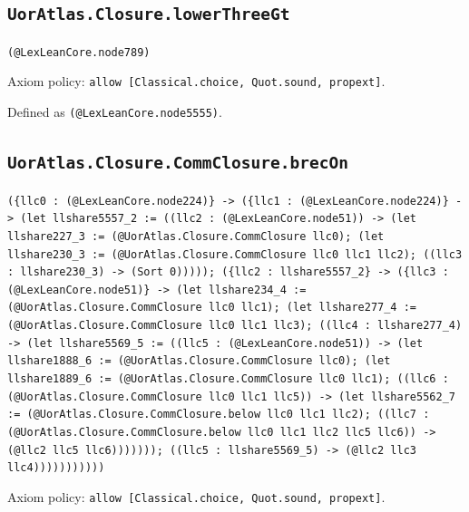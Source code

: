 \documentclass[11pt]{article}
\begin{document}
\subsection*{\texttt{UorAtlas.Closure.lowerThreeGt}}
\noindent\texttt{(@LexLeanCore.node789)}\par
\noindent Axiom policy: \texttt{allow [Classical.choice, Quot.sound, propext]}.\par
\noindent Defined as \texttt{(@LexLeanCore.node5555)}.\par
\subsection*{\texttt{UorAtlas.Closure.CommClosure.brecOn}}
\noindent\texttt{(\{llc0 : (@LexLeanCore.node224)\} -> (\{llc1 : (@LexLeanCore.node224)\} -> (let llshare5557\_2 := ((llc2 : (@LexLeanCore.node51)) -> (let llshare227\_3 := (@UorAtlas.Closure.CommClosure llc0); (let llshare230\_3 := (@UorAtlas.Closure.CommClosure llc0 llc1 llc2); ((llc3 : llshare230\_3) -> (Sort 0))))); (\{llc2 : llshare5557\_2\} -> (\{llc3 : (@LexLeanCore.node51)\} -> (let llshare234\_4 := (@UorAtlas.Closure.CommClosure llc0 llc1); (let llshare277\_4 := (@UorAtlas.Closure.CommClosure llc0 llc1 llc3); ((llc4 : llshare277\_4) -> (let llshare5569\_5 := ((llc5 : (@LexLeanCore.node51)) -> (let llshare1888\_6 := (@UorAtlas.Closure.CommClosure llc0); (let llshare1889\_6 := (@UorAtlas.Closure.CommClosure llc0 llc1); ((llc6 : (@UorAtlas.Closure.CommClosure llc0 llc1 llc5)) -> (let llshare5562\_7 := (@UorAtlas.Closure.CommClosure.below llc0 llc1 llc2); ((llc7 : (@UorAtlas.Closure.CommClosure.below llc0 llc1 llc2 llc5 llc6)) -> (@llc2 llc5 llc6))))))); ((llc5 : llshare5569\_5) -> (@llc2 llc3 llc4)))))))))))}\par
\noindent Axiom policy: \texttt{allow [Classical.choice, Quot.sound, propext]}.\par
\end{document}
